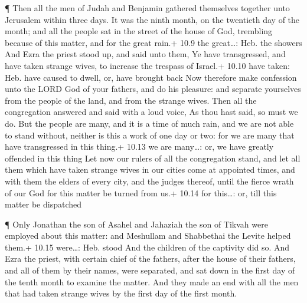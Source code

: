  ¶ Then all the men of Judah and Benjamin gathered
themselves together unto Jerusalem within three days. It was the ninth
month, on the twentieth day of the month; and all the people sat in the
street of the house of God, trembling because of this matter, and for
the great rain.+ 10.9 the great\ldots: Heb. the showers 
And Ezra the priest stood up, and said unto them, Ye have transgressed,
and have taken strange wives, to increase the trespass of Israel.+ 10.10
have taken: Heb. have caused to dwell, or, have brought back
 Now therefore make confession unto the LORD God of your
fathers, and do his pleasure: and separate yourselves from the people of
the land, and from the strange wives.  Then all the
congregation answered and said with a loud voice, As thou hast said, so
must we do.  But the people are many, and it is a time of
much rain, and we are not able to stand without, neither is this a work
of one day or two: for we are many that have transgressed in this
thing.+ 10.13 we are many\ldots: or, we have greatly offended in this
thing  Let now our rulers of all the congregation stand,
and let all them which have taken strange wives in our cities come at
appointed times, and with them the elders of every city, and the judges
thereof, until the fierce wrath of our God for this matter be turned
from us.+ 10.14 for this\ldots: or, till this matter be dispatched

 ¶ Only Jonathan the son of Asahel and Jahaziah the son of
Tikvah were employed about this matter: and Meshullam and Shabbethai the
Levite helped them.+ 10.15 were\ldots: Heb. stood  And the
children of the captivity did so. And Ezra the priest, with certain
chief of the fathers, after the house of their fathers, and all of them
by their names, were separated, and sat down in the first day of the
tenth month to examine the matter.  And they made an end
with all the men that had taken strange wives by the first day of the
first month.

